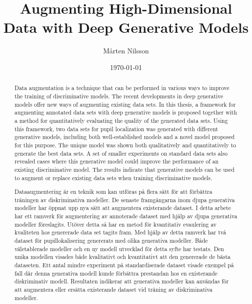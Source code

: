 \documentclass{kththesis}
\title{Augmenting High-Dimensional Data with Deep Generative Models}
\author{Mårten Nilsson}
\date{\today}
\begin{document}
\frontmatter

\titlepage

\begin{abstract}
Data augmentation is a technique that can be performed in various ways to improve the training of discriminative models. The recent developments in deep generative models offer new ways of augmenting existing data sets. In this thesis, a framework for augmenting annotated data sets with deep generative models is proposed together with a method for quantitatively evaluating the quality of the generated data sets. Using this framework, two data sets for pupil localization was generated with different generative models, including both well-established models and a novel model proposed for this purpose. The unique model was shown both qualitatively and quantitatively to generate the best data sets. A set of smaller experiments on standard data sets also revealed cases where this generative model could improve the performance of an existing discriminative model. The results indicate that generative models can be used to augment or replace existing data sets when training discriminative models.
\end{abstract}


\begin{otherlanguage}{swedish}
  \begin{abstract}
      Dataaugmentering är en teknik som kan utföras på flera sätt för att förbättra träningen av diskriminativa modeller. De senaste framgångarna inom djupa generativa modeller har öppnat upp nya sätt att augmentera existerande dataset. I detta arbete har ett ramverk för augmentering av annoterade dataset med hjälp av djupa generativa modeller föreslagits. Utöver detta så har en metod för kvantitativ evaulering av kvaliteten hos genererade data set tagits fram. Med hjälp av detta ramverk har två dataset för pupillokalisering genererats med olika generativa modeller. Både väletablerade modeller och en ny modell utvecklad för detta syfte har testats. Den unika modellen visades både kvalitativt och kvantitativt att den genererade de bästa dataseten. Ett antal mindre experiment på standardiserade dataset visade exempel på fall där denna generativa modell kunde förbättra prestandan hos en existerande diskriminativ modell. Resultaten indikerar att generativa modeller kan användas för att augmentera eller ersätta existerande dataset vid träning av diskriminativa modeller.
  \end{abstract}
\end{otherlanguage}
\end{document}
